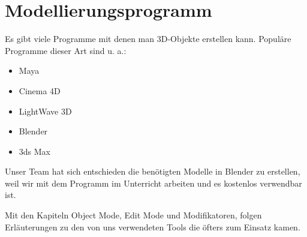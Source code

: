 \section{Modellierungsprogramm}
Es gibt viele Programme mit denen man 3D-Objekte erstellen kann.\citep{wiki:modellierungsprogramm_beispiele}
Populäre Programme dieser Art sind u. a.:

\begin{itemize}
    \item Maya
    \item Cinema 4D
    \item LightWave 3D
    \item Blender
    \item 3ds Max
\end{itemize}

Unser Team hat sich entschieden die benötigten Modelle in Blender zu erstellen, weil wir mit dem Programm im Unterricht arbeiten und
es kostenlos verwendbar ist.

Mit den Kapiteln Object Mode, Edit Mode und Modifikatoren, folgen Erläuterungen zu
den von uns verwendeten Tools die öfters zum Einsatz kamen.
